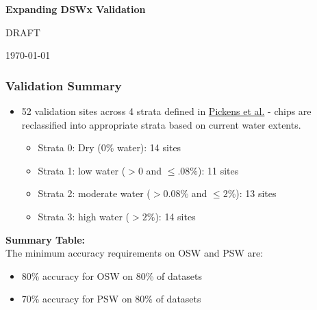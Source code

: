 \documentclass[8pt]{beamer}
\begin{document}
\begin{frame}
\begin{center}
\textbf{Expanding DSWx Validation}\\
\vspace{.5cm}

DRAFT

\today\\
\end{center}
\end{frame}
\begin{frame}
\frametitle{Validation Summary}
\tiny
\begin{itemize}
\item 52 validation sites across 4 strata defined in \href{https://www.sciencedirect.com/science/article/pii/S0034425720301620}{Pickens et al.} - chips are reclassified into appropriate strata based on current water extents.
\begin{itemize}
\tiny
\item Strata 0: Dry (0$\%$ water): 14 sites
\item Strata 1: low water ($>0$ and $\leq.08\%$): 11 sites
\item Strata 2: moderate  water ($>0.08\%$ and $\leq 2\%$): 13 sites
\item Strata 3: high water ($>2\%$): 14 sites
\end{itemize}
\end{itemize}

\vfill
\textbf{Summary Table:}
 \\[2\baselineskip]

The minimum accuracy requirements on OSW and PSW are:
\begin{itemize}
\item 80\% accuracy for OSW on 80\% of datasets
\item 70\% accuracy for PSW on 80\% of datasets
\end{itemize}


\begin{center}

\end{center}

\end{frame}
\end{document}
